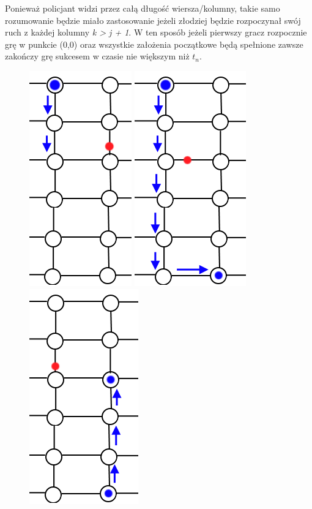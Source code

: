 \documentclass[brudnopis]{xmgr}
\begin{document}
\indent Ponieważ policjant widzi przez całą długość wiersza/kolumny, takie samo rozumowanie będzie miało zastosowanie jeżeli złodziej będzie rozpoczynał swój ruch z każdej kolumny \textit{k > j + 1}. W ten sposób jeżeli pierwszy gracz rozpocznie grę w punkcie (0,0) oraz wszystkie założenia początkowe będą spełnione zawsze zakończy grę sukcesem w czasie nie większym niż \textit{$t_n$}.

\begin{figure}[ht!]
  \includegraphics{rysunki/poscig_1.png}
  \includegraphics{rysunki/poscig_2.png}
  \includegraphics{rysunki/poscig_3.png}

\end{figure}
\end{document}
